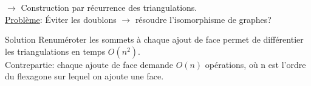 \documentclass[french,xcolor=dvipsnames]{beamer}
\begin{document}
\begin{frame}
\begin{figure}
			\end{figure}
		$\rightarrow$ Construction par récurrence des triangulations.\\
		\underline{Problème}: Éviter les doublons \small{$\rightarrow$} résoudre l'isomorphisme de graphes?
		\end{frame}
		
		\begin{frame}{Solution}
			Renuméroter les sommets à chaque ajout de face permet de différentier les triangulations en temps $O(n^{2})$.\\
			Contrepartie: chaque ajoute de face demande $O(n)$ opérations, où n est l'ordre du flexagone sur lequel on ajoute une face.
		\end{frame}		
		
\end{document}
